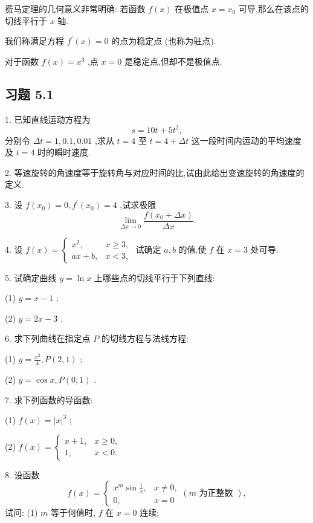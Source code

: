 费马定理的几何意义非常明确: 若函数 \(f\left( x\right)\) 在极值点 \(x = {x}_{0}\) 可导,那么在该点的切线平行于 \(x\) 轴.

我们称满足方程 \({f}^{\prime }\left( x\right)  = 0\) 的点为稳定点 (也称为驻点).

对于函数 \(f\left( x\right)  = {x}^{3}\) ,点 \(x = 0\) 是稳定点,但却不是极值点.

\subsection{习题 5.1}

1. 已知直线运动方程为
\[
s = {10t} + 5{t}^{2},
\]
分别令 \({\Delta t} = 1,{0.1},{0.01}\) ,求从 \(t = 4\) 至 \(t = 4 + {\Delta t}\) 这一段时间内运动的平均速度及 \(t = 4\) 时的瞬时速度.

2. 等速旋转的角速度等于旋转角与对应时间的比,试由此给出变速旋转的角速度的定义.

3. 设 \(f\left( {x}_{0}\right)  = 0,{f}^{\prime }\left( {x}_{0}\right)  = 4\) ,试求极限
\[
\mathop{\lim }\limits_{{{\Delta x} \rightarrow  0}}\frac{f\left( {{x}_{0} + {\Delta x}}\right) }{\Delta x}.
\]

4. 设 \(f\left( x\right)  = \left\{  \begin{matrix} {x}^{2}, & x \geq  3, \\  {ax} + b, & x < 3, \end{matrix}\right.\) 试确定 \(a,b\) 的值,使 \(f\) 在 \(x = 3\) 处可导.

5. 试确定曲线 \(y = \ln x\) 上哪些点的切线平行于下列直线:

(1) \(y = x - 1\) ;

(2) \(y = {2x} - 3\) .

6. 求下列曲线在指定点 \(P\) 的切线方程与法线方程:

(1) \(y = \frac{{x}^{2}}{4},P\left( {2,1}\right)\) ;

(2) \(y = \cos x,P\left( {0,1}\right)\) .

7. 求下列函数的导函数:

(1) \(f\left( x\right)  = {\left| x\right| }^{3}\) ;

(2) \(f\left( x\right)  = \left\{  \begin{matrix} x + 1, & x \geq  0, \\  1, & x < 0. \end{matrix}\right.\)

8. 设函数
\[
f\left( x\right)  = \left\{  {\begin{matrix} {x}^{m}\sin \frac{1}{x}, & x \neq  0, \\  0, & x = 0 \end{matrix}\left( {m\text{ 为正整数 }}\right) ,}\right.
\]
试问: (1) \(m\) 等于何值时, \(f\) 在 \(x = 0\) 连续;

